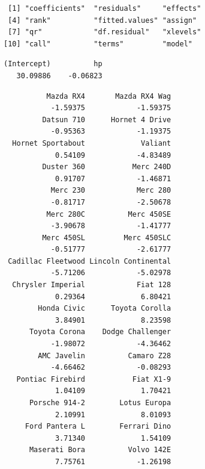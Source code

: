 \documentclass[]{krantz}
\makeatletter
\newenvironment{Shaded}{\begin{snugshade}}{\end{snugshade}}
\newcommand{\NormalTok}[1]{#1}
\newcommand{\OperatorTok}[1]{\textcolor[rgb]{0.43,0.43,0.43}{\textbf{#1}}}
\newcommand{\StringTok}[1]{\textcolor[rgb]{0.5,0.5,0.5}{#1}}
\newenvironment{kframe}{%
\medskip{}
\setlength{\fboxsep}{.8em}
 \def\at@end@of@kframe{}%
 \ifinner\ifhmode%
  \def\at@end@of@kframe{\end{minipage}}%
  \begin{minipage}{\columnwidth}%
 \fi\fi%
 \def\FrameCommand##1{\hskip\@totalleftmargin \hskip-\fboxsep
 \colorbox{shadecolor}{##1}\hskip-\fboxsep
     \hskip-\linewidth \hskip-\@totalleftmargin \hskip\columnwidth}%
 \MakeFramed {\advance\hsize-\width
   \@totalleftmargin\z@ \linewidth\hsize
   \@setminipage}}%
 {\par\unskip\endMakeFramed%
 \at@end@of@kframe}
\renewenvironment{Shaded}{\begin{kframe}}{\end{kframe}}
\makeatother
\begin{document}
\begin{verbatim}
 [1] "coefficients"  "residuals"     "effects"      
 [4] "rank"          "fitted.values" "assign"       
 [7] "qr"            "df.residual"   "xlevels"      
[10] "call"          "terms"         "model"        
\end{verbatim}

\begin{Shaded}
\end{Shaded}

\begin{verbatim}
(Intercept)          hp 
   30.09886    -0.06823 
\end{verbatim}

\begin{Shaded}
\end{Shaded}

\begin{verbatim}
          Mazda RX4       Mazda RX4 Wag 
           -1.59375            -1.59375 
         Datsun 710      Hornet 4 Drive 
           -0.95363            -1.19375 
  Hornet Sportabout             Valiant 
            0.54109            -4.83489 
         Duster 360           Merc 240D 
            0.91707            -1.46871 
           Merc 230            Merc 280 
           -0.81717            -2.50678 
          Merc 280C          Merc 450SE 
           -3.90678            -1.41777 
         Merc 450SL         Merc 450SLC 
           -0.51777            -2.61777 
 Cadillac Fleetwood Lincoln Continental 
           -5.71206            -5.02978 
  Chrysler Imperial            Fiat 128 
            0.29364             6.80421 
        Honda Civic      Toyota Corolla 
            3.84901             8.23598 
      Toyota Corona    Dodge Challenger 
           -1.98072            -4.36462 
        AMC Javelin          Camaro Z28 
           -4.66462            -0.08293 
   Pontiac Firebird           Fiat X1-9 
            1.04109             1.70421 
      Porsche 914-2        Lotus Europa 
            2.10991             8.01093 
     Ford Pantera L        Ferrari Dino 
            3.71340             1.54109 
      Maserati Bora          Volvo 142E 
            7.75761            -1.26198 
\end{verbatim}
\end{document}
